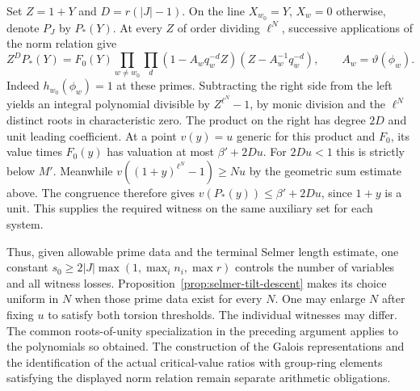 Set $Z=1+Y$ and $D=r(|J|-1)$. On the line $X_{w_0}=Y$, $X_w=0$ otherwise,
denote $P_J$ by $P_*(Y)$. At every $Z$ of order dividing $\ell^N$, successive
applications of the norm relation give
\[
 Z^D P_*(Y)= F_0(Y)
 \prod_{w\ne w_0}\prod_d
 (1-A_wq_w^{-d} Z)(Z-A_w^{-1}q_w^{-d}),
 \qquad A_w=\vartheta(\phi_w).
\]
Indeed $h_{w_0}(\phi_w)=1$ at these primes. Subtracting the right side
from the left yields an integral polynomial divisible by $Z^{\ell^N}-1$,
by monic division and the $\ell^N$ distinct roots in characteristic zero.
The product on the right has degree $2D$ and unit leading coefficient.
At a point $v(y)=u$ generic for this product and $F_0$, its value times
$F_0(y)$ has valuation at most $\beta'+2Du$. For $2Du<1$ this
is strictly below $M'$. Meanwhile $v((1+y)^{\ell^N}-1)\geq Nu$ by the
geometric sum estimate above. The congruence therefore gives
$v(P_*(y))\leq\beta'+2Du$, since $1+y$ is a unit.
This supplies the required witness on the same auxiliary set for each system.

Thus, given allowable prime data and the terminal Selmer length estimate,
one constant $s_0\geq2|J|\max(1,\max_i n_i,\max r)$ controls the number
of variables and all witness losses. Proposition~\ref{prop:selmer-tilt-descent}
makes its choice uniform in $N$ when those prime data exist for every $N$.
One may enlarge $N$ after fixing $u$ to satisfy both torsion thresholds.
The individual witnesses may differ. The common roots-of-unity specialization
in the preceding argument applies to the polynomials so obtained.
The construction of the Galois representations and the identification of the
actual critical-value ratios with group-ring elements satisfying the displayed
norm relation remain separate arithmetic obligations.
